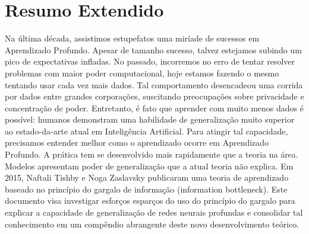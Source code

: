 \begin{otherlanguage}{brazilian}
  \chapter*{Resumo Extendido}
  Na última década, assistimos estupefatos uma miríade de sucessos em Aprendizado Profundo. Apesar de tamanho sucesso, talvez estejamos subindo um pico de expectativas infladas. No passado, incorremos no erro de tentar resolver problemas com maior poder computacional, hoje estamos fazendo o mesmo tentando usar cada vez mais dados. Tal comportamento desencadeou uma corrida por dados entre grandes corporações, suscitando preocupações sobre privacidade e concentração de poder. Entretanto, é fato que aprender com muito menos dados é possível: humanos demonstram uma habilidade de generalização muito superior ao estado-da-arte atual em Inteligência Artificial. Para atingir tal capacidade, precisamos entender melhor como o aprendizado ocorre em Aprendizado Profundo.  A prática tem se desenvolvido mais rapidamente que a teoria na área. Modelos apresentam poder de generalização que a atual teoria não explica. Em 2015, Naftali Tishby e Noga Zaslavsky publicaram uma teoria de aprendizado baseado no princípio do gargalo de informação (information bottleneck). Este documento visa investigar esforços esparços do uso do princípio do gargalo para explicar a capacidade de generalização de redes neurais profundas e consolidar tal conhecimento em um compêndio abrangente deste novo desenvolvimento teórico.
  \end{otherlanguage}

  \vfill
